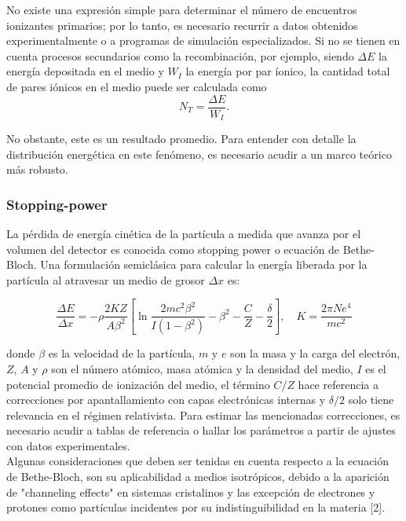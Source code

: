 \documentclass[]{book}
\begin{document}
\noindent No existe una expresión simple para determinar el número de encuentros ionizantes primarios; por lo tanto, es necesario recurrir a datos obtenidos experimentalmente o a programas de simulación especializados. Si no se tienen en cuenta procesos secundarios como la recombinación, por ejemplo, siendo $\Delta E$ la energía depositada en el medio y $W_{I}$ la energía por par íonico, la cantidad total de pares iónicos en el medio puede ser calculada como 
\begin{equation}
    \label{eq:num_ion}
    N_{T} = \frac{\Delta E}{W_{I}}.
\end{equation}

No obstante, este es un resultado promedio. Para entender con detalle la distribución energética en este fenómeno, es necesario acudir a un marco teórico más robusto.

\subsubsection{Stopping-power}

\noindent La pérdida de energía cinética de la partícula a medida que avanza por el volumen del detector es conocida como stopping power o ecuación de Bethe-Bloch. Una formulación semiclásica para calcular la energía liberada por la partícula al atravesar un medio de grosor $\Delta x$ es: 

\begin{equation}
    \label{eq:bethe_bloch}
    \frac{\Delta E}{\Delta x}=-\rho \frac{2 K Z}{A \beta^2}\left[\ln \frac{2 m c^2 \beta^2}{I\left(1-\beta^2\right)}-\beta^2-\frac{C}{Z}-\frac{\delta}{2}\right], \quad K = \frac{2 \pi N e^{4}}{mc^{2}}
    \end{equation}

donde $\beta$ es la velocidad de la partícula, $m$ y $e$ son la masa y la carga del electrón, $Z$, $A$ y $\rho$ son el número atómico, masa atómica y la densidad del medio, $I$ es el potencial promedio de ionización del medio, el término $C/Z$ hace referencia a correcciones por apantallamiento con capas electrónicas internas y $\delta /2$ solo tiene relevancia en el régimen relativista. Para estimar las mencionadas correcciones, es necesario acudir a tablas de referencia o hallar los parámetros a partir de ajustes con datos experimentales.\\ 

\noindent Algunas consideraciones que deben ser tenidas en cuenta respecto a la ecuación de Bethe-Bloch, son su aplicabilidad a medios isotrópicos, debido a la aparición de "channeling effects" en sistemas cristalinos y las excepción de electrones y protones como partículas incidentes por su indistinguibilidad en la materia [2].\\
\end{document}
